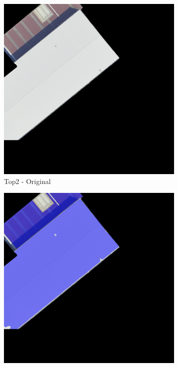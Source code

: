\begin{figure}[H]
\begin{subfigure}{0.32\textwidth}
    \includegraphics[width=\textwidth]{02-main//figures/ch4/kfold_ensembles/segformer_tu-mambaout_base/best_cases/best_4_iou0.984_24931117_tile_18_5_f475a0_original.png}
    \caption{Top2 - Original}
\end{subfigure}
\hfill
\begin{subfigure}{0.32\textwidth}
    \includegraphics[width=\textwidth]{02-main//figures/ch4/kfold_ensembles/segformer_tu-mambaout_base/best_cases/best_4_iou0.984_24931117_tile_18_5_f475a0_overlay_gt.png}

\end{subfigure}
\end{figure}
